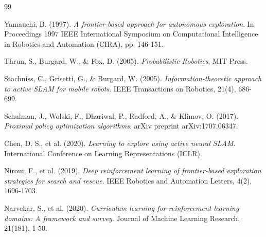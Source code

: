 \documentclass[11pt,a4paper]{article}
\begin{document}
\begin{thebibliography}{99}

Yamauchi, B. (1997).
\textit{A frontier-based approach for autonomous exploration}.
In Proceedings 1997 IEEE International Symposium on Computational Intelligence in Robotics and Automation (CIRA), pp. 146-151.

Thrun, S., Burgard, W., \& Fox, D. (2005).
\textit{Probabilistic Robotics}.
MIT Press.

Stachniss, C., Grisetti, G., \& Burgard, W. (2005).
\textit{Information-theoretic approach to active SLAM for mobile robots}.
IEEE Transactions on Robotics, 21(4), 686-699.

Schulman, J., Wolski, F., Dhariwal, P., Radford, A., \& Klimov, O. (2017).
\textit{Proximal policy optimization algorithms}.
arXiv preprint arXiv:1707.06347.

Chen, D. S., et al. (2020).
\textit{Learning to explore using active neural SLAM}.
International Conference on Learning Representations (ICLR).

Niroui, F., et al. (2019).
\textit{Deep reinforcement learning of frontier-based exploration strategies for search and rescue}.
IEEE Robotics and Automation Letters, 4(2), 1696-1703.

Narvekar, S., et al. (2020).
\textit{Curriculum learning for reinforcement learning domains: A framework and survey}.
Journal of Machine Learning Research, 21(181), 1-50.

\end{thebibliography}
\end{document}
